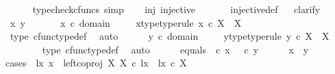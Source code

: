 \begin{isabellebody}
\ \ \ \ \isamarkupfalse%
\ {\isacharparenleft}{\kern0pt}typecheck{\isacharunderscore}{\kern0pt}cfuncs{\isacharcomma}{\kern0pt}\ simp{\isacharparenright}{\kern0pt}\isanewline
\ \ \isamarkupfalse%
\ {\isasymrho}{\isacharunderscore}{\kern0pt}inj{\isacharcolon}{\kern0pt}\ {\isachardoublequoteopen}injective\ {\isasymrho}{\isachardoublequoteclose}\isanewline
\ \ \ \ \isamarkupfalse%
\ injective{\isacharunderscore}{\kern0pt}def\isanewline
\ \ \isamarkupfalse%
{\isacharparenleft}{\kern0pt}clarify{\isacharparenright}{\kern0pt}\isanewline
\ \ \ \ \isamarkupfalse%
\ x\ y\ \isanewline
\ \ \ \ \isamarkupfalse%
\ {\isachardoublequoteopen}x\ {\isasymin}\isactrlsub c\ domain\ {\isasymrho}{\isachardoublequoteclose}\ \isamarkupfalse%
\ \isamarkupfalse%
\ x{\isacharunderscore}{\kern0pt}type{\isacharbrackleft}{\kern0pt}type{\isacharunderscore}{\kern0pt}rule{\isacharbrackright}{\kern0pt}{\isacharcolon}{\kern0pt}\ {\isachardoublequoteopen}x\ {\isasymin}\isactrlsub c\ X\ {\isasymCoprod}\ X{\isachardoublequoteclose}\isanewline
\ \ \ \ \ \ \isamarkupfalse%
\ {\isasymrho}{\isacharunderscore}{\kern0pt}type\ cfunc{\isacharunderscore}{\kern0pt}type{\isacharunderscore}{\kern0pt}def\ \isamarkupfalse%
\ auto\isanewline
\ \ \ \ \isamarkupfalse%
\ {\isachardoublequoteopen}y\ {\isasymin}\isactrlsub c\ domain\ {\isasymrho}{\isachardoublequoteclose}\ \isamarkupfalse%
\ \isamarkupfalse%
\ y{\isacharunderscore}{\kern0pt}type{\isacharbrackleft}{\kern0pt}type{\isacharunderscore}{\kern0pt}rule{\isacharbrackright}{\kern0pt}{\isacharcolon}{\kern0pt}\ {\isachardoublequoteopen}y\ {\isasymin}\isactrlsub c\ X\ {\isasymCoprod}\ X{\isachardoublequoteclose}\isanewline
\ \ \ \ \ \ \isamarkupfalse%
\ {\isasymrho}{\isacharunderscore}{\kern0pt}type\ cfunc{\isacharunderscore}{\kern0pt}type{\isacharunderscore}{\kern0pt}def\ \isamarkupfalse%
\ auto\isanewline
\ \ \ \ \isamarkupfalse%
\ equals{\isacharcolon}{\kern0pt}\ {\isachardoublequoteopen}{\isasymrho}\ {\isasymcirc}\isactrlsub c\ x\ {\isacharequal}{\kern0pt}\ {\isasymrho}\ {\isasymcirc}\isactrlsub c\ y{\isachardoublequoteclose}\isanewline
\ \ \ \ \isamarkupfalse%
\ {\isachardoublequoteopen}x\ {\isacharequal}{\kern0pt}\ y{\isachardoublequoteclose}\isanewline
\ \ \ \ \isamarkupfalse%
{\isacharparenleft}{\kern0pt}cases\ {\isachardoublequoteopen}{\isasymexists}\ lx{\isachardot}{\kern0pt}\ x\ {\isacharequal}{\kern0pt}\ left{\isacharunderscore}{\kern0pt}coproj\ X\ X\ {\isasymcirc}\isactrlsub c\ lx\ {\isasymand}\ lx\ {\isasymin}\isactrlsub c\ X{\isachardoublequoteclose}{\isacharparenright}{\kern0pt}\isanewline

\end{isabellebody}
